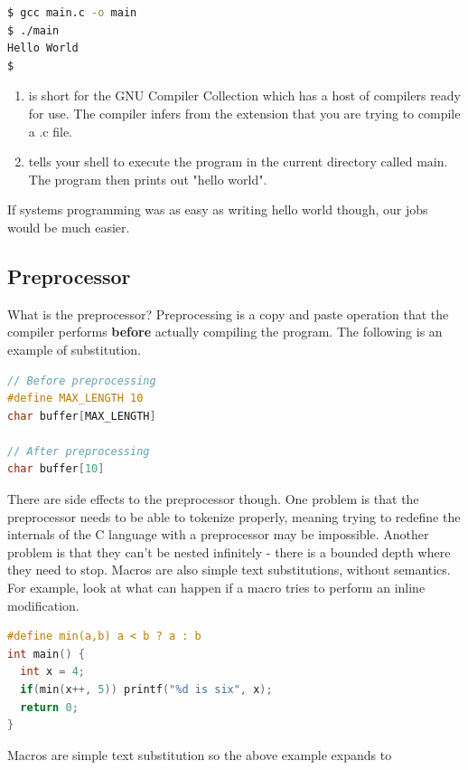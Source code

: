 \begin{lstlisting}[language=bash]
$ gcc main.c -o main
$ ./main
Hello World
$
\end{lstlisting}

\begin{enumerate}
\item {} is short for the GNU Compiler Collection which has a host of compilers ready for use.
  The compiler infers from the extension that you are trying to compile a .c file.
\item {} tells your shell to execute the program in the current directory called main.
  The program then prints out "hello world".
\end{enumerate}

If systems programming was as easy as writing hello world though, our jobs would be much easier.

\subsection{Preprocessor}

What is the preprocessor?
Preprocessing is a copy and paste operation that the compiler performs \textbf{before} actually compiling the program.
The following is an example of substitution.

\begin{lstlisting}[language=C]
// Before preprocessing
#define MAX_LENGTH 10
char buffer[MAX_LENGTH]

// After preprocessing
char buffer[10]
\end{lstlisting}

There are side effects to the preprocessor though.
One problem is that the preprocessor needs to be able to tokenize properly, meaning trying to redefine the internals of the C language with a preprocessor may be impossible.
Another problem is that they can't be nested infinitely - there is a bounded depth where they need to stop.
Macros are also simple text substitutions, without semantics.
For example, look at what can happen if a macro tries to perform an inline modification.

\begin{lstlisting}[language=C]
#define min(a,b) a < b ? a : b
int main() {
  int x = 4;
  if(min(x++, 5)) printf("%d is six", x);
  return 0;
}
\end{lstlisting}

Macros are simple text substitution so the above example expands to

